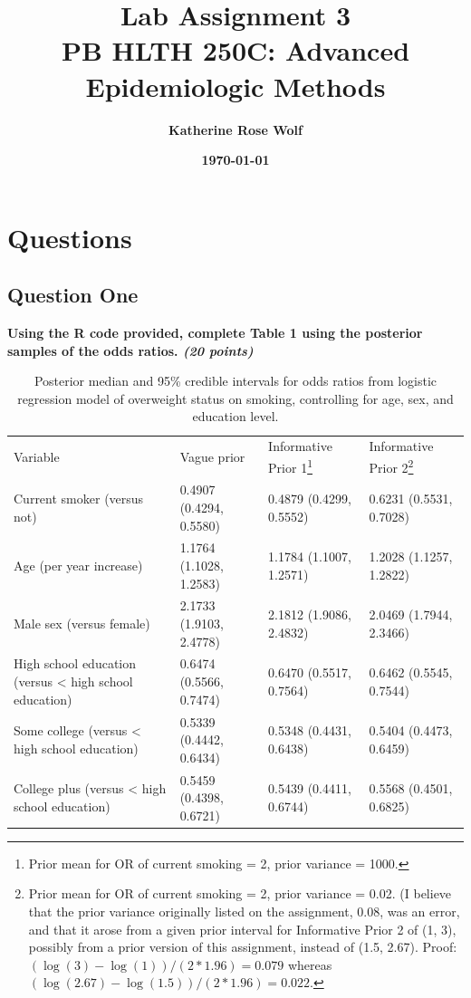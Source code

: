 \documentclass[
  11pt,
]{article}
\title{\fontsize{15pt}{5pt}\selectfont\textbf{Lab Assignment 3}\\
\vspace{.2cm}\textbf{PB HLTH 250C: Advanced Epidemiologic Methods}}
\author{\vspace{-.1cm}\fontsize{15pt}{0pt}\selectfont\textbf{Katherine Rose Wolf}}
\date{\vspace{-.3cm}\fontsize{15pt}{0pt}\selectfont\textbf{\today}}
\begin{document}
\maketitle

\pagebreak

\hypertarget{questions}{%
\section{Questions}\label{questions}}

\hypertarget{question-one}{%
\subsection{Question One}\label{question-one}}

\textbf{Using the R code provided, complete Table 1 using the posterior samples of the odds ratios. \textit{(20 points)}}

\begin{landscape}
\begin{table}
\begin{minipage}{\textwidth}
\caption{Posterior median and 95\% credible intervals for odds ratios from logistic regression model of overweight status on smoking, controlling for age, sex, and education level.}
\begin{tabular}{llll}
\hline
  Variable & Vague prior & Informative Prior 1\footnote{Prior mean for OR of current smoking = 2, prior variance = 1000.} & Informative Prior 2\footnote{Prior mean for OR of current smoking = 2, prior variance = 0.02. (I believe that the prior variance originally listed on the assignment, 0.08, was an error, and that it arose from a given prior interval for Informative Prior 2 of (1, 3), possibly from a prior version of this assignment, instead of (1.5, 2.67). Proof: $(\log(3)-\log(1))/(2*1.96) = 0.079$ whereas $(\log(2.67)-\log(1.5))/(2*1.96) = 0.022$.} \\
  \cline{1-4}
Current smoker (versus not)  & 0.4907 (0.4294, 0.5580) & 0.4879 (0.4299, 0.5552) & 0.6231 (0.5531, 0.7028) \\
Age (per year increase)      & 1.1764 (1.1028, 1.2583) & 1.1784 (1.1007, 1.2571) & 1.2028 (1.1257, 1.2822) \\
Male sex (versus female) & 2.1733 (1.9103, 2.4778) & 2.1812 (1.9086, 2.4832) & 2.0469 (1.7944, 2.3466) \\
High school education (versus < high school education) & 0.6474 (0.5566, 0.7474) & 0.6470 (0.5517, 0.7564) & 0.6462 (0.5545, 0.7544) \\
Some college (versus < high school education) & 0.5339 (0.4442, 0.6434) & 0.5348 (0.4431, 0.6438) & 0.5404 (0.4473, 0.6459) \\
College plus (versus < high school education) & 0.5459 (0.4398, 0.6721) & 0.5439 (0.4411, 0.6744) & 0.5568 (0.4501, 0.6825) \\
\hline
\end{tabular}
\end{minipage}
\end{table}
\end{landscape}
\end{document}
